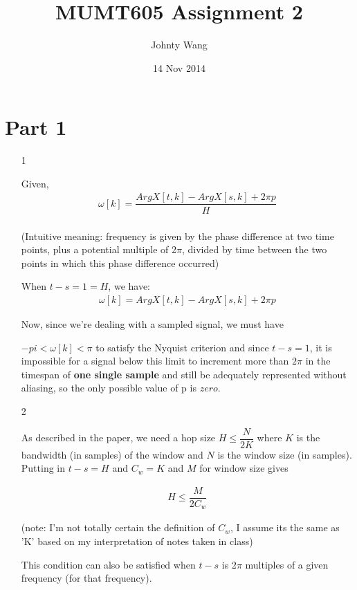 \documentclass[12pt]{article}
\title{MUMT605 Assignment 2}
\author{Johnty Wang}
\date{14 Nov 2014}
\begin{document}
\maketitle

\section*{Part 1}
\begin{enumerate}


\item[1]{

Given,
\begin{align*}
\omega[k] = \dfrac{Arg X [t,k] - Arg X [s, k] + 2\pi p}{H}\\
\end{align*}

(Intuitive meaning: frequency is given by the phase difference at two time points, plus a potential multiple of 2$\pi$, divided by time between the two points in which this phase difference occurred)

When $t - s = 1 = H$, we have:
\begin{align*}
\omega[k] = Arg X [t,k] - Arg X [s, k] + 2\pi p
\end{align*}

Now, since we're dealing with a sampled signal, we must have 

$-pi < \omega[k] < \pi$ to satisfy the Nyquist criterion and since $t - s = 1$, it is impossible for a signal below this limit to increment more than $2\pi$ in the timespan of \textbf{one single sample} and still be adequately represented without aliasing, so the only possible value of p is $zero$.
}

\item[2]{

As described in the paper, we need a hop size $H \leq \dfrac{N}{2K}$ where $K$ is the bandwidth (in samples) of the window and $N$ is the window size (in samples). Putting in $t - s = H$ and $C_w = K$ and $M$ for window size gives

\begin{align*}
H \leq \dfrac{M}{2C_w}
\end{align*}

(note: I'm not totally certain the definition of $C_w$, I assume its the same as 'K' based on my interpretation of notes taken in class)

This condition can also be satisfied when $t - s$ is 2$\pi$ multiples of a given frequency (for that frequency).
}


\end{enumerate}
\end{document}
